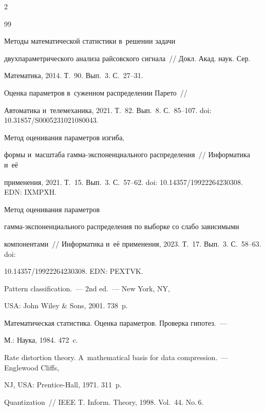 \begin{multicols}{2}
{{\begin{thebibliography}{99}


 Методы математической статистики в~решении задачи 


двухпараметрического анализа райсовского сигнала~// Докл. Акад. наук. Сер. 


Математика, 2014. Т.~90. Вып.~3. С.~27--31.




 Оценка параметров в~суженном распределении Парето~// 


Автоматика и~телемеханика, 2021. Т.~82. Вып.~8. С.~85--107. doi: 10.31857/S0005231021080043.




 Метод оценивания параметров изгиба, 


формы и~масштаба гам\-ма-экс\-по\-нен\-ци\-аль\-но\-го распределения~// Информатика и~её 


применения, 2021. Т.~15. Вып.~3. С.~57--62. doi: 10.14357/19922264230308. EDN: IXMPXH.




 Метод оценивания параметров  


гам\-ма-экс\-по\-нен\-ци\-аль\-но\-го распределения по выборке со слабо зависимыми 


компонентами~// Информатика и~её применения, 2023. Т.~17. Вып.~3. С.~58--63. doi: 


10.14357/19922264230308.  EDN: PEXTVK.




 Pattern classification.~--- 2nd ed.~--- New York, NY, 


USA: John Wiley \& Sons, 2001. 738~p.




 Математическая статистика. Оценка параметров. Проверка гипотез.~--- 


М.: Наука, 1984. 472~c.




 Rate distortion theory. A~mathematical basis for data compression.~--- Englewood Cliffs, 


NJ, USA: Prentice-Hall, 1971. 311~p.




 Quantization~// IEEE T. Inform. Theory, 1998. Vol.~44. No.\,6. 



\end{thebibliography}}}
\end{multicols}
